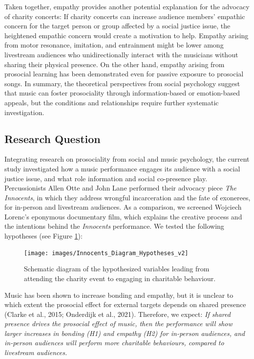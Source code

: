 \documentclass[
  man,floatsintext]{apa6}
\begin{document}
Taken together, empathy provides another potential explanation for the advocacy of charity concerts: If charity concerts can increase audience members' empathic concern for the target person or group affected by a social justice issue, the heightened empathic concern would create a motivation to help. Empathy arising from motor resonance, imitation, and entrainment might be lower among livestream audiences who unidirectionally interact with the musicians without sharing their physical presence. On the other hand, empathy arising from prosocial learning has been demonstrated even for passive exposure to prosocial songs. In summary, the theoretical perspectives from social psychology suggest that music can foster prosociality through information-based or emotion-based appeals, but the conditions and relationships require further systematic investigation.

\subsection{Research Question}\label{research-question}

Integrating research on prosociality from social and music psychology, the current study investigated how a music performance engages its audience with a social justice issue, and what role information and social co-presence play. Percussionists Allen Otte and John Lane performed their advocacy piece \textit{The Innocents}, in which they address wrongful incarceration and the fate of exonerees, for in-person and livestream audiences. As a comparison, we screened Wojciech Lorenc's eponymous documentary film, which explains the creative process and the intentions behind the \textit{Innocents} performance. We tested the following hypotheses (see Figure \ref{fig:hypotheses}):



\begin{figure}
\texttt{[image: images/Innocents\_Diagram\_Hypotheses\_v2]} \caption{Schematic diagram of the hypothesized variables leading from attending the charity event to engaging in charitable behaviour.}\label{fig:hypotheses}
\end{figure}

Music has been shown to increase bonding and empathy, but it is unclear to which extent the prosocial effect for external targets depends on shared presence (Clarke et al., 2015; Onderdijk et al., 2021). Therefore, we expect: \emph{If shared presence drives the prosocial effect of music, then the performance will show larger increases in bonding (H1) and empathy (H2) for in-person audiences, and in-person audiences will perform more charitable behaviours, compared to livestream audiences.}
\end{document}
